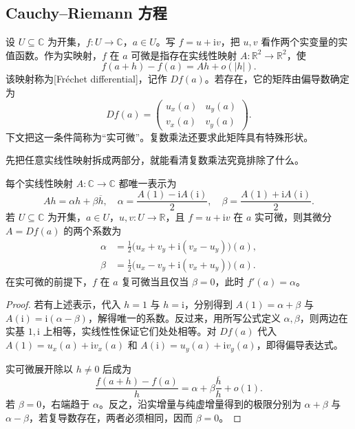 \subsection{Cauchy--Riemann 方程}
\label{b3:subsec:010102}

设 \(U\subseteq\mathbb C\) 为开集，\(f:U\to\mathbb C\)，\(a\in U\)。写 \(f=u+\mathrm{i}v\)，把 \(u,v\) 看作两个实变量的实值函数。作为实映射，\(f\) 在 \(a\) 可微是指存在实线性映射 \(A:\mathbb R^2\rightarrow\mathbb R^2\)，使
\[
 f(a+h)-f(a)=Ah+o(\lvert h\rvert).
\]
该映射称为[Fréchet differential]，记作 \(Df(a)\)。若存在，它的矩阵由偏导数确定为
\[
 Df(a)=
 \begin{pmatrix}
 u_x(a)&u_y(a)\\
 v_x(a)&v_y(a)
 \end{pmatrix}.
\]
下文把这一条件简称为“实可微”。复数乘法还要求此矩阵具有特殊形状。

先把任意实线性映射拆成两部分，就能看清复数乘法究竟排除了什么。

\begin{proposition}\label{b3:prop:01-real-linear-decomposition}
每个实线性映射 \(A:\mathbb C\to\mathbb C\) 都唯一表示为
\begin{equation}\label{b3:eq:01-real-linear-decomposition}
 Ah=\alpha h+\beta\overline h,
 \quad
 \alpha=\frac{A(1)-\mathrm{i}A(\mathrm{i})}{2},
 \quad
 \beta=\frac{A(1)+\mathrm{i}A(\mathrm{i})}{2}.
\end{equation}
若 \(U\subseteq\mathbb C\) 为开集，\(a\in U\)，\(u,v:U\to\mathbb R\)，且 \(f=u+\mathrm{i}v\) 在 \(a\) 实可微，则其微分 \(A=Df(a)\) 的两个系数为
\[
 \begin{aligned}
 \alpha&=\frac12\bigl(u_x+v_y+\mathrm{i}(v_x-u_y)\bigr)(a),\\
 \beta&=\frac12\bigl(u_x-v_y+\mathrm{i}(v_x+u_y)\bigr)(a).
 \end{aligned}
\]
在实可微的前提下，\(f\) 在 \(a\) 复可微当且仅当 \(\beta=0\)，此时 \(f'(a)=\alpha\)。
\end{proposition}
\begin{proof}
若有上述表示，代入 \(h=1\) 与 \(h=\mathrm{i}\)，分别得到
\(A(1)=\alpha+\beta\) 与 \(A(\mathrm{i})=\mathrm{i}(\alpha-\beta)\)，解得唯一的系数。反过来，用所写公式定义 \(\alpha,\beta\)，则两边在实基 \(1,\mathrm{i}\) 上相等，实线性性保证它们处处相等。对 \(Df(a)\) 代入
\(A(1)=u_x(a)+\mathrm{i}v_x(a)\) 和
\(A(\mathrm{i})=u_y(a)+\mathrm{i}v_y(a)\)，即得偏导表达式。

实可微展开除以 \(h\ne0\) 后成为
\[
 \frac{f(a+h)-f(a)}h
 =\alpha+\beta\frac{\overline h}{h}+o(1).
\]
若 \(\beta=0\)，右端趋于 \(\alpha\)。反之，沿实增量与纯虚增量得到的极限分别为 \(\alpha+\beta\) 与 \(\alpha-\beta\)，若复导数存在，两者必须相同，因而 \(\beta=0\)。
\end{proof}

